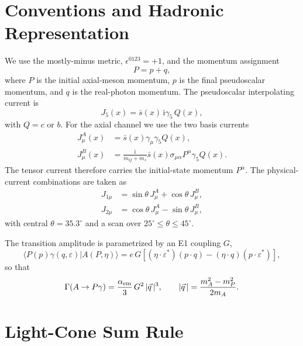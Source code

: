 \documentclass[11pt]{article}
\newcommand{\ii}{\mathrm{i}}
\begin{document}
\section{Conventions and Hadronic Representation}

We use the mostly-minus metric, $\epsilon^{0123}=+1$, and the momentum
assignment
\begin{equation}
  P=p+q,
\end{equation}
where $P$ is the initial axial-meson momentum, $p$ is the final pseudoscalar
momentum, and $q$ is the real-photon momentum.  The pseudoscalar interpolating
current is
\begin{equation}
  J_5(x)=\bar s(x)\,\ii\gamma_5\,Q(x),
\end{equation}
with $Q=c$ or $b$.  For the axial channel we use the two basis currents
\begin{align}
  J^{A}_{\mu}(x) &= \bar s(x)\gamma_\mu\gamma_5 Q(x),\\
  J^{B}_{\mu}(x) &=
  \frac{\ii}{m_Q+m_s}\bar s(x)\sigma_{\mu\alpha}P^\alpha\gamma_5 Q(x).
\end{align}
The tensor current therefore carries the initial-state momentum $P^\alpha$.
The physical-current combinations are taken as
\begin{align}
  J_{1\mu} &= \sin\theta\,J^A_\mu+\cos\theta\,J^B_\mu,\\
  J_{2\mu} &= \cos\theta\,J^A_\mu-\sin\theta\,J^B_\mu,
\end{align}
with central $\theta=35.3^\circ$ and a scan over
$25^\circ\leq\theta\leq45^\circ$.

The transition amplitude is parametrized by an E1 coupling $G$,
\begin{equation}
  \langle P(p)\gamma(q,\varepsilon)|A(P,\eta)\rangle
  =
  e\,G\left[(\eta\cdot\varepsilon^*)(p\cdot q)
  -(\eta\cdot q)(p\cdot\varepsilon^*)\right],
\end{equation}
so that
\begin{equation}
  \Gamma(A\to P\gamma)
  =
  \frac{\alpha_{\rm em}}{3}\,G^2\,|\vec q\,|^3,\qquad
  |\vec q\,|=\frac{m_A^2-m_P^2}{2m_A}.
  \label{eq:width}
\end{equation}

\section{Light-Cone Sum Rule}
\end{document}
